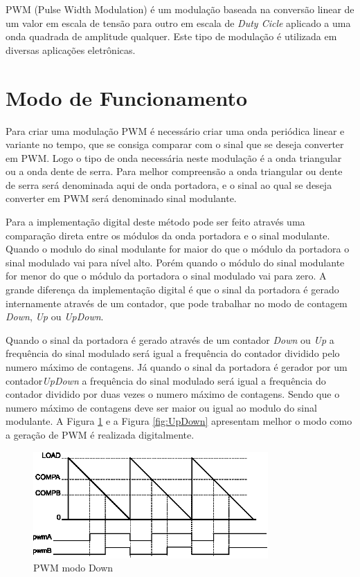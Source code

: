 
PWM (Pulse Width Modulation) é um modulação baseada na conversão linear de um valor em escala de tensão para outro em escala de \emph{Duty Cicle} aplicado a uma onda quadrada de amplitude qualquer. Este tipo de modulação é utilizada em diversas aplicações eletrônicas. 

\section{Modo de Funcionamento}

Para criar uma modulação PWM é necessário criar uma onda periódica linear e variante no tempo, que se consiga comparar com o sinal que se deseja converter em PWM. Logo o tipo de onda necessária neste modulação é a onda triangular ou a onda dente de serra. Para melhor compreensão a onda triangular ou dente de serra será denominada aqui de onda portadora, e o sinal ao qual se deseja converter em PWM será denominado sinal modulante.
  
Para a implementação digital deste método pode ser feito através uma comparação direta entre os módulos da onda portadora e o sinal modulante. Quando o modulo do sinal modulante for maior do que o  módulo da portadora  o sinal modulado vai para nível alto. Porém quando o módulo do sinal modulante for menor do que o módulo da portadora o sinal  modulado vai para zero. A grande diferença da implementação digital é que o sinal da portadora é gerado internamente através de um contador, que pode trabalhar no modo de contagem \emph{Down}, \emph{Up} ou \emph{UpDown}.

Quando o sinal da portadora é gerado através de um contador \emph{Down} ou \emph{Up}  a frequência do sinal modulado será igual a frequência do contador dividido pelo numero máximo de contagens. Já quando o sinal da portadora é gerador por um contador\emph{UpDown} a frequência do sinal modulado será igual a frequência do contador dividido por duas vezes o numero máximo de contagens. Sendo que o numero máximo de contagens deve ser maior ou igual ao modulo do sinal modulante. A Figura \ref{fig:Down} e a Figura \ref{fig:UpDown} apresentam melhor o modo como a geração de PWM é realizada digitalmente.  

\begin{figure}[H]
	\centering
\includegraphics[width=0.8\textwidth] {figuras/Down.eps}
	\caption{PWM modo Down \cite{DATASHEET_TIVA}}
	\label{fig:Down}
\end{figure}


